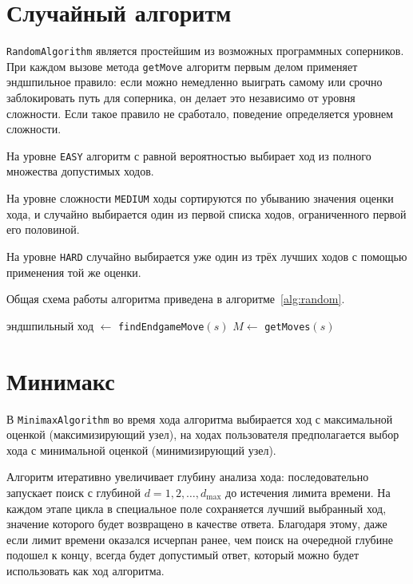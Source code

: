 \documentclass[a4paper,12pt]{diplom}
\begin{document}
\section{Случайный алгоритм}

\texttt{RandomAlgorithm} является простейшим из возможных программных соперников. При каждом вызове метода \texttt{getMove} алгоритм первым делом применяет эндшпильное правило: если можно немедленно выиграть самому или срочно заблокировать путь для соперника, он делает это независимо от уровня сложности. Если такое правило не сработало, поведение определяется уровнем сложности.

На уровне \texttt{EASY} алгоритм с равной вероятностью выбирает ход из полного множества допустимых ходов.

На уровне сложности \texttt{MEDIUM} ходы сортируются по убыванию значения оценки хода, и случайно выбирается один из первой списка ходов, ограниченного первой его половиной.

На уровне \texttt{HARD} случайно выбирается уже один из трёх лучших ходов с помощью применения той же оценки.

Общая схема работы алгоритма приведена в алгоритме~\ref{alg:random}.

\begin{algorithm}
\caption{Случайный алгоритм}\label{alg:random}
эндшпильный ход $\leftarrow$ \texttt{findEndgameMove}$(s)$\;
$M \leftarrow$ \texttt{getMoves}$(s)$\;
\end{algorithm}

\section{Минимакс}

В \texttt{MinimaxAlgorithm} во время хода алгоритма выбирается ход с максимальной оценкой (максимизирующий узел), на ходах пользователя предполагается выбор хода с минимальной оценкой (минимизирующий узел).

Алгоритм итеративно увеличивает глубину анализа хода: последовательно запускает поиск с глубиной $d = 1, 2, \ldots, d_{\max}$ до истечения лимита времени. На каждом этапе цикла в специальное поле сохраняется лучший выбранный ход, значение которого будет возвращено в качестве ответа. Благодаря этому, даже если лимит времени оказался исчерпан ранее, чем поиск на очередной глубине подошел к концу, всегда будет допустимый ответ, который можно будет использовать как ход алгоритма.
\end{document}
